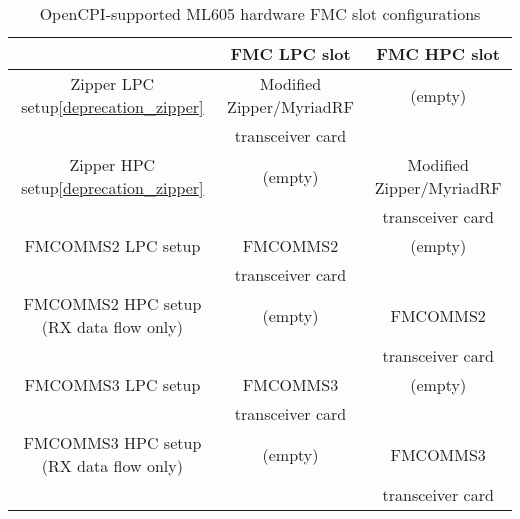 \documentclass{article}
\begin{document}
\begin{center}
        \begin{table}[!htbp]
        \centering
        \caption{OpenCPI-supported ML605 hardware FMC slot configurations}
        \label{table:supported_slots}
        \begin{tabular}{|c|c|c|}
                \cline{2-3} \hline
                 & FMC LPC slot & FMC HPC slot \\ \hline
                \multicolumn{1}{|c|}{Zipper LPC setup\ref{deprecation_zipper}} & Modified\cite{zipper_mods} Zipper/MyriadRF & (empty)\\ 
                \multicolumn{1}{|c|}{ } & transceiver card & \\ \hline
                \multicolumn{1}{|c|}{Zipper HPC setup\ref{deprecation_zipper}} & (empty) & Modified\cite{zipper_mods} Zipper/MyriadRF \\
                \multicolumn{1}{|c|}{ } & & transceiver card \\ \hline
                \multicolumn{1}{|c|}{FMCOMMS2 LPC setup} & FMCOMMS2 & (empty)\\
                \multicolumn{1}{|c|}{ } & transceiver card & \\ \hline
                \multicolumn{1}{|c|}{FMCOMMS2 HPC setup (RX data flow only)} & (empty) & FMCOMMS2 \\
                \multicolumn{1}{|c|}{ } & & transceiver card \\ \hline
                \multicolumn{1}{|c|}{FMCOMMS3 LPC setup} & FMCOMMS3 & (empty)\\
                \multicolumn{1}{|c|}{ } & transceiver card & \\ \hline
                \multicolumn{1}{|c|}{FMCOMMS3 HPC setup (RX data flow only)} & (empty) & FMCOMMS3 \\
                \multicolumn{1}{|c|}{ } & & transceiver card \\ \hline
        \end{tabular}
        \end{table}




\end{center}
\end{document}
